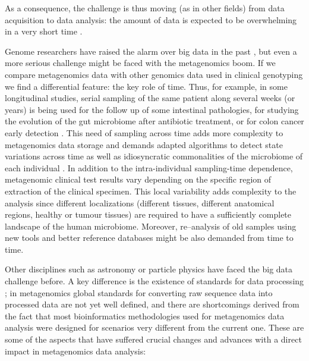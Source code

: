 \documentclass{frontiersSCNS} %
\begin{document}
As a consequence, the challenge is thus moving (as in other fields) from
data acquisition to data analysis: the amount of data is expected to be
overwhelming in a very short time \citep{stephens2015big}.

Genome researchers have raised the alarm over big data in the past
\citep{hayden2015genome}, but even a more serious challenge might be
faced with the metagenomics boom. If we compare metagenomics data with
other genomics data used in clinical genotyping we find a differential
feature: the key role of time. Thus, for example, in some longitudinal
studies, serial sampling of the same patient along several weeks (or
years) is being used for the follow up of some intestinal pathologies,
for studying the evolution of the gut microbiome after antibiotic
treatment, or for colon cancer early detection
\citep{zeller2014potential}. This need of sampling across time adds more
complexity to metagenomics data storage and demands adapted algorithms
to detect state variations across time as well as idiosyncratic
commonalities of the microbiome of each individual
\citep{franzosa2015identifying}. In addition to the intra-individual
sampling-time dependence, metagenomic clinical test results vary
depending on the specific region of extraction of the clinical specimen.
This local variability adds complexity to the analysis since different
localizations (different tissues, different anatomical regions, healthy
or tumour tissues) are required to have a sufficiently complete
landscape of the human microbiome. Moreover, re--analysis of old samples
using new tools and better reference databases might be also demanded
from time to time.

Other disciplines such as astronomy or particle physics have faced the
big data challenge before. A key difference is the existence of
standards for data processing \citep{stephens2015big}; in metagenomics
global standards for converting raw sequence data into processed data
are not yet well defined, and there are shortcomings derived from the
fact that most bioinformatics methodologies used for metagenomics data
analysis were designed for scenarios very different from the current
one. These are some of the aspects that have suffered crucial changes
and advances with a direct impact in metagenomics data analysis:
\end{document}
